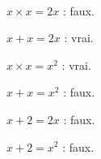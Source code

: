 \ \\ [-5mm]
   \begin{colenumerate}{2}
      \item $x\times x = 2x$ : {\blue faux}.
      \item $x+x = 2x$ : {\blue vrai}.
      \item $x\times x = x^{2}$ : {\blue vrai}.
      \item $x+x =x^{2}$ : {\blue faux}.
      \item $x+2 =2x$ : {\blue faux}.
      \item $x+2=x^{2}$ : {\blue faux}.
   \end{colenumerate}
